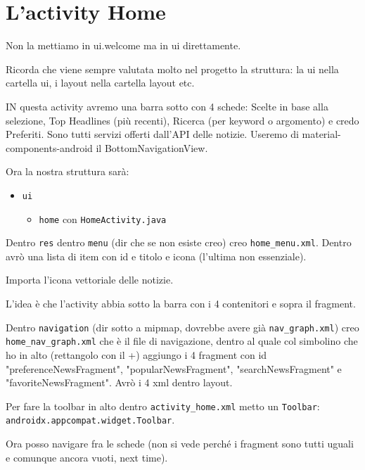 \section{L'activity Home}
Non la mettiamo in ui.welcome ma in ui direttamente.
\par Ricorda che viene sempre valutata molto nel progetto la struttura: la ui nella cartella ui, i layout nella cartella layout etc.
\par IN questa activity avremo una barra sotto con 4 schede: Scelte in base alla selezione, Top Headlines (più recenti), Ricerca (per keyword o argomento) e credo Preferiti. Sono tutti servizi offerti dall'API delle notizie. Useremo di material-components-android il BottomNavigationView.
\par Ora la nostra struttura sarà:
\begin{itemize}
    \item \texttt{ui}
    \begin{itemize}
        \item \texttt{home} con \texttt{HomeActivity.java}
    \end{itemize}
\end{itemize}
\par Dentro \texttt{res} dentro \texttt{menu} (dir che se non esiste creo) creo \texttt{home\_menu.xml}. Dentro avrò una lista di item con id e titolo e icona (l'ultima non essenziale).\\
\par Importa l'icona vettoriale delle notizie.
\par L'idea è che l'activity abbia sotto la barra con i 4 contenitori e sopra il fragment.
\par Dentro \texttt{navigation} (dir sotto a mipmap, dovrebbe avere già \texttt{nav\_graph.xml}) creo \texttt{home\_nav\_graph.xml} che è il file di navigazione, dentro al quale col simbolino che ho in alto (rettangolo con il +) aggiungo i 4 fragment con id "preferenceNewsFragment", "popularNewsFragment", "searchNewsFragment" e "favoriteNewsFragment". Avrò i 4 xml dentro layout.
\par Per fare la toolbar in alto dentro \texttt{activity\_home.xml} metto un \texttt{Toolbar}: \texttt{androidx.appcompat.widget.Toolbar}.
\par Ora posso navigare fra le schede (non si vede perché i fragment sono tutti uguali e comunque ancora vuoti, next time).



